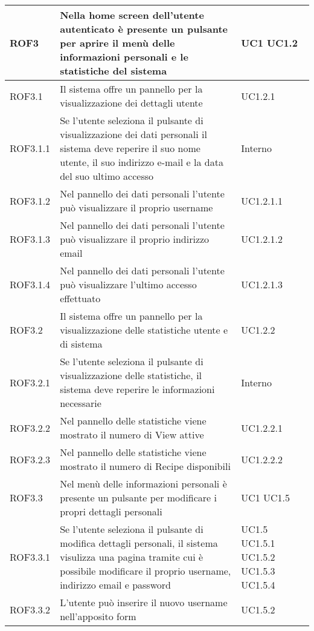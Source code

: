 \begin{center}
\begin{longtable}{| p{2.5cm} | p{8cm} | p{2cm} |}
		ROF3  &  Nella home screen dell'utente autenticato è presente un pulsante per aprire il menù delle informazioni personali e le statistiche del sistema  & UC1 \newline UC1.2 \\
		\hline
		ROF3.1  &  Il sistema offre un pannello per la visualizzazione dei dettagli utente &  UC1.2.1 \\
		\hline
		ROF3.1.1  &  Se l'utente seleziona il pulsante di visualizzazione dei dati personali il sistema deve reperire il suo nome utente, il suo indirizzo e-mail e la data del suo ultimo accesso &  Interno \\
		\hline
		ROF3.1.2  &  Nel pannello dei dati personali l'utente può visualizzare il proprio username  &  UC1.2.1.1 \\
		\hline
		ROF3.1.3  &  Nel pannello dei dati personali l'utente può visualizzare il proprio indirizzo email  &  UC1.2.1.2 \\
		\hline
		ROF3.1.4  &  Nel pannello dei dati personali l'utente può visualizzare l'ultimo accesso effettuato  &  UC1.2.1.3 \\
		\hline
		ROF3.2  &  Il sistema offre un pannello per la visualizzazione delle statistiche utente e di sistema  &  UC1.2.2 \\
		\hline
		ROF3.2.1  &  Se l'utente seleziona il pulsante di visualizzazione delle statistiche, il sistema deve reperire le informazioni necessarie  &  Interno \\
		\hline
		ROF3.2.2 &  Nel pannello delle statistiche viene mostrato il numero di View attive &  UC1.2.2.1 \\
		\hline
		ROF3.2.3  &  Nel pannello delle statistiche viene mostrato il numero di Recipe disponibili &  UC1.2.2.2 \\
		\hline
		ROF3.3  &  Nel menù delle informazioni personali è presente un pulsante per modificare i propri dettagli personali & UC1 \newline UC1.5 \\
		\hline
		ROF3.3.1  &  Se l'utente seleziona il pulsante di modifica dettagli personali, il sistema visulizza una pagina tramite cui è possibile modificare il proprio username, indirizzo email e password &  UC1.5 \newline UC1.5.1 \newline UC1.5.2 \newline UC1.5.3 \newline UC1.5.4 \\
		\hline
		ROF3.3.2  &  L'utente può inserire il nuovo username nell'apposito form  &  UC1.5.2 \\

\end{longtable}
\end{center}
